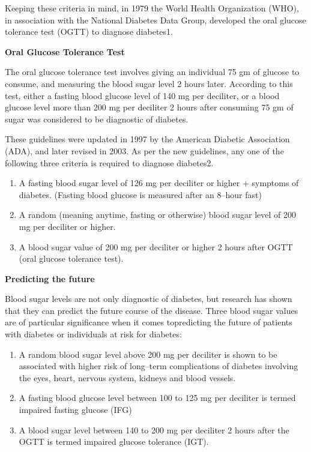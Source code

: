 Keeping these criteria in mind, in 1979 the World Health Organi\-zation (WHO), in association with the National Diabetes Data Group, developed the oral glucose tolerance test (OGTT) to diagnose diabetes1.

\noindent
\textbf{Oral Glucose Tolerance Test}

The oral glucose tolerance test involves giving an individual 75 gm of glucose to consume, and measuring the blood sugar level 2 hours later. According to this test, either a fasting blood glucose level of 140 mg per deciliter, or a blood glucose level more than 200 mg per deciliter 2 hours after consuming 75 gm of sugar was considered to be diagnostic of diabetes.

These guidelines were updated in 1997 by the American Diabetic Association (ADA), and later revised in 2003. As per the new guidelines, any one of the following three criteria is required to diagnose diabetes2.

\begin{enumerate}
\itemsep=0pt
\item A fasting blood sugar level of 126 mg per deciliter or higher + symptoms of diabetes. (Fasting blood glucose is measured after an 8–hour fast)
\item A random (meaning anytime, fasting or otherwise) blood sugar level of 200 mg per deciliter or higher.
\item A blood sugar value of 200 mg per deciliter or higher 2 hours after OGTT (oral glucose tolerance test).
 \end{enumerate}

\noindent
\textbf{Predicting the future}

Blood sugar levels are not only diagnostic of diabetes, but research has shown that they can predict the future course of the disease. Three blood sugar values are of particular significance when it comes to\break predicting the future of patients with diabetes or individuals at risk for diabetes:

\begin{enumerate}
\itemsep=0pt
\item A random blood sugar level above 200 mg per deciliter is shown to be associated with higher risk of long–term complications of diabetes involving the eyes, heart, nervous system, kidneys and blood vessels.
 \item A fasting blood glucose level between 100 to 125 mg per deciliter is termed impaired fasting glucose (IFG)
 \item A blood sugar level between 140 to 200 mg per deciliter 2 hours after the OGTT is termed impaired glucose tolerance (IGT).
 \end{enumerate}


